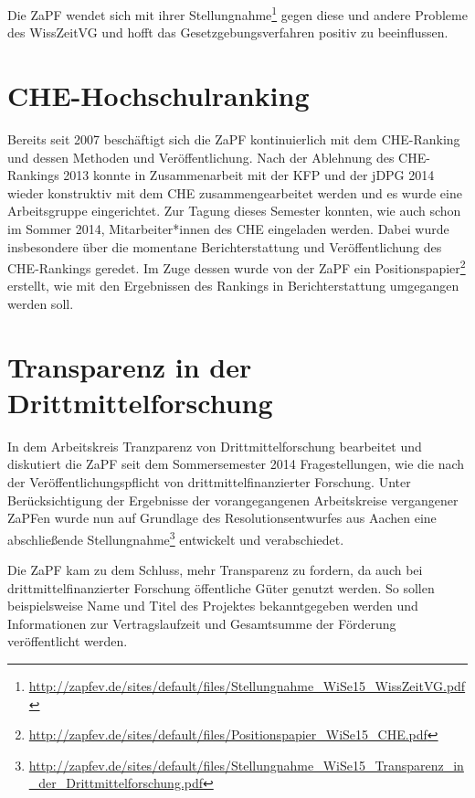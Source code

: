 Die ZaPF wendet sich mit ihrer
Stellungnahme\footnote{\href{http://zapfev.de/sites/default/files/Stellungnahme\_WiSe15\_WissZeitVG.pdf}{\url{http://zapfev.de/sites/default/files/Stellungnahme\_WiSe15\_WissZeitVG.pdf}}}
gegen diese und andere Probleme des WissZeitVG und hofft das
Gesetzgebungsverfahren positiv zu beeinflussen.

\section*{CHE-Hochschulranking}
Bereits seit 2007 beschäftigt sich die ZaPF kontinuierlich mit dem CHE-Ranking
und dessen Methoden und Veröffentlichung. Nach der Ablehnung des CHE-Rankings
2013 konnte in Zusammenarbeit mit der KFP und der jDPG 2014 wieder konstruktiv
mit dem CHE zusammengearbeitet werden und es wurde eine Arbeitsgruppe
eingerichtet. Zur Tagung dieses Semester konnten, wie auch schon im Sommer 2014,
Mitarbeiter*innen des CHE eingeladen werden. Dabei wurde insbesondere über die
momentane Berichterstattung und Veröffentlichung des CHE-Rankings geredet. Im
Zuge dessen wurde von der ZaPF ein
Positionspapier\footnote{\href{http://zapfev.de/sites/default/files/Positionspapier\_WiSe15\_CHE.pdf}{\url{http://zapfev.de/sites/default/files/Positionspapier\_WiSe15\_CHE.pdf}}}
erstellt, wie mit den Ergebnissen des Rankings in Berichterstattung umgegangen
werden soll.

\section*{Transparenz in der Drittmittelforschung}
In dem Arbeitskreis \glqq{}Tranzparenz von Drittmittelforschung\grqq{}
bearbeitet und diskutiert die ZaPF seit dem Sommersemester 2014 Fragestellungen,
wie die nach der Veröffentlichungspflicht von drittmittelfinanzierter Forschung.
Unter Berücksichtigung der Ergebnisse der vorangegangenen Arbeitskreise
vergangener ZaPFen wurde nun auf Grundlage des Resolutionsentwurfes aus Aachen
eine abschließende
Stellungnahme\footnote{\href{http://zapfev.de/sites/default/files/Stellungnahme\_WiSe15\_Transparenz\_in\_der\_Drittmittelforschung.pdf}{\url{http://zapfev.de/sites/default/files/Stellungnahme\_WiSe15\_Transparenz\_in\_der\_Drittmittelforschung.pdf}}}
entwickelt und verabschiedet.

Die ZaPF kam zu dem Schluss, mehr Transparenz zu fordern, da auch bei
drittmittelfinanzierter Forschung öffentliche Güter genutzt werden. So sollen
beispielsweise Name und Titel des Projektes bekanntgegeben werden und
Informationen zur Vertragslaufzeit und Gesamtsumme der Förderung veröffentlicht
werden.

